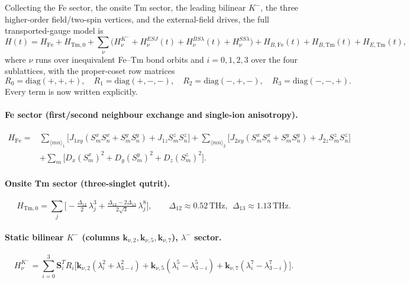 \documentclass[11pt,a4paper]{article}
\newcommand{\Fe}{\mathrm{Fe}}
\newcommand{\Tm}{\mathrm{Tm}}
\newcommand{\diag}{\mathrm{diag}}
\newcommand{\ve}[1]{\boldsymbol{#1}}
\begin{document}
Collecting the Fe sector, the onsite Tm sector, the leading bilinear $K^-$, the
three higher-order field/two-spin vertices, and the external-field drives, the
full transported-gauge model is
\begin{equation}
  \boxed{
  H(t)=H_{\Fe}+H_{\Tm,0}
  +\sum_\nu\!\Big(H^{K^-}_\nu+H^{ESJ}_\nu(t)+H^{BS\lambda}_\nu(t)+H^{SS\lambda}_\nu\Big)
  +H_{B,\Fe}(t)+H_{B,\Tm}(t)+H_{E,\Tm}(t),}
  \label{eq:full-H}
\end{equation}
where $\nu$ runs over inequivalent Fe--Tm bond orbits and $i=0,1,2,3$ over the
four sublattices, with the proper-coset row matrices
\begin{equation}
  R_0=\diag(+,+,+),\quad R_1=\diag(+,-,-),\quad
  R_2=\diag(-,+,-),\quad R_3=\diag(-,-,+).
\end{equation}
Every term is now written explicitly.

\paragraph{Fe sector (first/second neighbour exchange and single-ion anisotropy).}
\begin{equation}
\begin{aligned}
  H_{\Fe}={}&\sum_{\langle mn\rangle_1}\!\big[J_{1xy}(S_m^xS_n^x{+}S_m^yS_n^y)+J_{1z}S_m^zS_n^z\big]
  +\sum_{\langle mn\rangle_2}\!\big[J_{2xy}(S_m^xS_n^x{+}S_m^yS_n^y)+J_{2z}S_m^zS_n^z\big]\\
  &+\sum_m\big[D_x(S_m^x)^2{+}D_y(S_m^y)^2{+}D_z(S_m^z)^2\big].
\end{aligned}
\end{equation}

\paragraph{Onsite Tm sector (three-singlet qutrit).}
\begin{equation}
  H_{\Tm,0}=\sum_j\Big[-\tfrac{\Delta_{12}}{2}\,\lambda_j^3
  +\tfrac{\Delta_{12}-2\Delta_{13}}{2\sqrt3}\,\lambda_j^8\Big],
  \qquad \Delta_{12}\approx0.52\,\mathrm{THz},\ \ \Delta_{13}\approx1.13\,\mathrm{THz}.
\end{equation}

\paragraph{Static bilinear $K^-$ (columns $\ve k_{\nu,2},\ve k_{\nu,5},\ve k_{\nu,7}$), $\lambda^-$ sector.}
\begin{equation}
  H^{K^-}_\nu=\sum_{i=0}^3\ve S_i^TR_i
  \big[\ve k_{\nu,2}(\lambda_i^2+\lambda_{3-i}^2)
  +\ve k_{\nu,5}(\lambda_i^5-\lambda_{3-i}^5)
  +\ve k_{\nu,7}(\lambda_i^7-\lambda_{3-i}^7)\big].
\end{equation}
\end{document}
